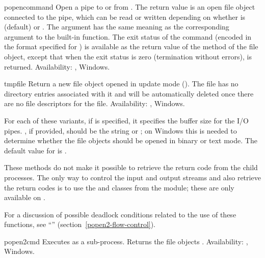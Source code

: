 \begin{funcdesc}{popen}{command}
Open a pipe to or from .  The return value is an open
file object connected to the pipe, which can be read or written
depending on whether  is  (default) or .
The  argument has the same meaning as the corresponding
argument to the built-in  function.  The exit status of
the command (encoded in the format specified for ) is
available as the return value of the  method of the file
object, except that when the exit status is zero (termination without
errors),  is returned.
Availability: \UNIX, Windows.

\end{funcdesc}

\begin{funcdesc}{tmpfile}{}
Return a new file object opened in update mode ().  The file
has no directory entries associated with it and will be automatically
deleted once there are no file descriptors for the file.
Availability: \UNIX, Windows.
\end{funcdesc}


For each of these  variants, if  is
specified, it specifies the buffer size for the I/O pipes.
, if provided, should be the string  or
; on Windows this is needed to determine whether the file
objects should be opened in binary or text mode.  The default value
for  is .

These methods do not make it possible to retrieve the return code from
the child processes.  The only way to control the input and output
streams and also retrieve the return codes is to use the
 and  classes from the 
module; these are only available on \UNIX.

For a discussion of possible deadlock conditions related to the use
of these functions, see ``''
(section~\ref{popen2-flow-control}).

\begin{funcdesc}{popen2}{cmd}
Executes  as a sub-process.  Returns the file objects
.
Availability: \UNIX, Windows.
\end{funcdesc}

